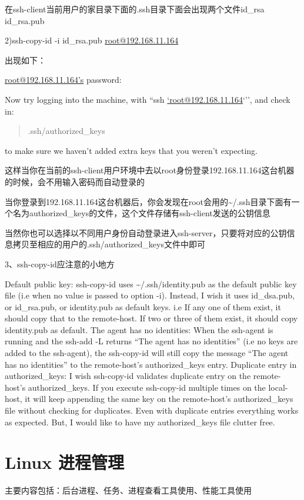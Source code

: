 \documentclass[letterpaper,10pt]{sphinxmanual}
\begin{document}
在ssh-client当前用户的家目录下面的.ssh目录下面会出现两个文件id\_rsa id\_rsa.pub

2)ssh-copy-id -i id\_rsa.pub \href{mailto:root@192.168.11.164}{root@192.168.11.164}

出现如下：

\href{mailto:root@192.168.11.164's}{root@192.168.11.164's} password:

Now try logging into the machine, with ``ssh \href{mailto:'root@192.168.11.164}{`root@192.168.11.164}`'', and check in:
\begin{quote}

.ssh/authorized\_keys
\end{quote}

to make sure we haven't added extra keys that you weren't expecting.

这样当你在当前的ssh-client用户环境中去以root身份登录192.168.11.164这台机器的时候，会不用输入密码而自动登录的

当你登录到192.168.11.164这台机器后，你会发现在root会用的\textasciitilde{}/.ssh目录下面有一个名为authorized\_keys的文件，这个文件存储有ssh-client发送的公钥信息

当然你也可以选择以不同用户身份自动登录进入ssh-server，只要将对应的公钥信息拷贝至相应的用户的.ssh/authorized\_keys文件中即可

3、ssh-copy-id应注意的小地方

Default public key: ssh-copy-id uses \textasciitilde{}/.ssh/identity.pub as the default public key file (i.e when no value is passed to option -i). Instead, I wish it uses id\_dsa.pub, or id\_rsa.pub, or identity.pub as default keys. i.e If any one of them exist, it should copy that to the remote-host. If two or three of them exist, it should copy identity.pub as default.
The agent has no identities: When the ssh-agent is running and the ssh-add -L returns “The agent has no identities” (i.e no keys are added to the ssh-agent), the ssh-copy-id will still copy the message “The agent has no identities” to the remote-host’s authorized\_keys entry.
Duplicate entry in authorized\_keys: I wish ssh-copy-id validates duplicate entry on the remote-host’s authorized\_keys. If you execute ssh-copy-id multiple times on the local-host, it will keep appending the same key on the remote-host’s authorized\_keys file without checking for duplicates. Even with duplicate entries everything works as expected. But, I would like to have my authorized\_keys file clutter free.


\section{Linux 进程管理}
\label{Linux_pro_mana/index::doc}\label{Linux_pro_mana/index:linux}
主要内容包括：后台进程、任务、进程查看工具使用、性能工具使用
\end{document}
